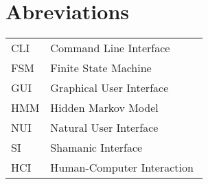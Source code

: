 \chapter*{Abreviations}

\begin{flushleft}
\begin{tabular}{l p{0.8\linewidth}}
CLI     & Command Line Interface\\
FSM     & Finite State Machine\\
GUI     & Graphical User Interface\\
HMM     & Hidden Markov Model\\
NUI     & Natural User Interface\\
SI      & Shamanic Interface\\
HCI     & Human-Computer Interaction
\end{tabular}
\end{flushleft}

